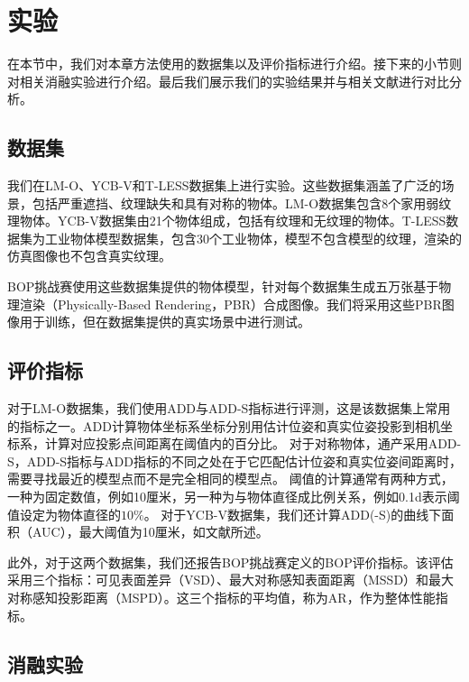 \section{实验}\label{sec:exp}

在本节中，我们对本章方法使用的数据集以及评价指标进行介绍。接下来的小节则对相关消融实验进行介绍。最后我们展示我们的实验结果并与相关文献进行对比分析。

\subsection{数据集}
我们在LM-O\cite{lmo}、YCB-V\cite{ycbv}和T-LESS\cite{tless}数据集上进行实验。这些数据集涵盖了广泛的场景，包括严重遮挡、纹理缺失和具有对称的物体。LM-O数据集包含8个家用弱纹理物体。YCB-V数据集由21个物体组成，包括有纹理和无纹理的物体。T-LESS数据集为工业物体模型数据集，包含30个工业物体，模型不包含模型的纹理，渲染的仿真图像也不包含真实纹理。

BOP挑战赛\cite{Sundermeyer2023BOPC2}使用这些数据集提供的物体模型，针对每个数据集生成五万张基于物理渲染（Physically-Based Rendering，PBR）合成图像。我们将采用这些PBR图像用于训练，但在数据集提供的真实场景中进行测试。

\subsection{评价指标}

\par 对于LM-O数据集，我们使用ADD与ADD-S指标进行评测，这是该数据集上常用的指标之一。ADD计算物体坐标系坐标分别用估计位姿和真实位姿投影到相机坐标系，计算对应投影点间距离在阈值内的百分比。
对于对称物体，通产采用ADD-S，ADD-S指标与ADD指标的不同之处在于它匹配估计位姿和真实位姿间距离时，需要寻找最近的模型点而不是完全相同的模型点。
阈值的计算通常有两种方式，一种为固定数值，例如10厘米，另一种为与物体直径成比例关系，例如0.1d表示阈值设定为物体直径的$10\%$。
对于YCB-V数据集，我们还计算ADD(-S)的曲线下面积（AUC），最大阈值为10厘米，如文献\cite{ycbv}所述。

\par 此外，对于这两个数据集，我们还报告BOP挑战赛定义的BOP评价指标\cite{Sundermeyer2023BOPC2}。该评估采用三个指标：可见表面差异（VSD）、最大对称感知表面距离（MSSD）和最大对称感知投影距离（MSPD）。这三个指标的平均值，称为AR，作为整体性能指标。

\subsection{消融实验}

